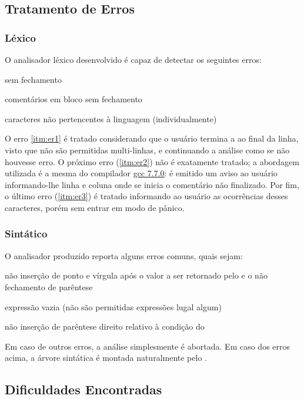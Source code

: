 \documentclass[
	article,			%
	11pt,				%
	oneside,			%
	a4paper,			%
	english,			%
	brazil,				%
	sumario=tradicional
	]{abntex2}
\begin{document}
\subsection{Tratamento de Erros}
\subsubsection{Léxico}
O analisador léxico desenvolvido é capaz de detectar os seguintes erros:
\begin{enumerate}{
	\item \label{itm:er1} sem fechamento
	\item \label{itm:er2}comentários em bloco sem fechamento
	\item \label{itm:er3}caracteres não pertencentes à linguagem (individualmente)
}\end{enumerate}
O erro \ref{itm:er1} é tratado considerando que o usuário termina a  ao final da linha, visto que não são permitidas  multi-linhas, e continuando a análise como se não houvesse erro.
O próximo erro (\ref{itm:er2}) não é exatamente tratado; a abordagem utilizada é a mesma do compilador \href{https://gcc.gnu.org/}{gcc 7.7.0}: é emitido um aviso ao usuário informando-lhe linha e coluna onde se inicia o comentário não finalizado.
Por fim, o último erro (\ref{itm:er3}) é tratado informando ao usuário as ocorrências desses caracteres, porém sem entrar em modo de pânico.


\subsubsection{Sintático}
O analisador produzido reporta alguns erros comuns, quais sejam:

\begin{itemize}{
		\item não inserção de ponto e vírgula após o valor a ser retornado pelo  e o não fechamento de parêntese 
		\item expressão vazia (não são permitidas expressões lugal algum)
		\item não inserção de parêntese direito relativo à condição do 
	}
\end{itemize}
Em caso de outros erros, a análise simplesmente é abortada. Em caso dos erros acima, a árvore sintática é montada naturalmente pelo .
\subsection {Dificuldades Encontradas}
\end{document}
